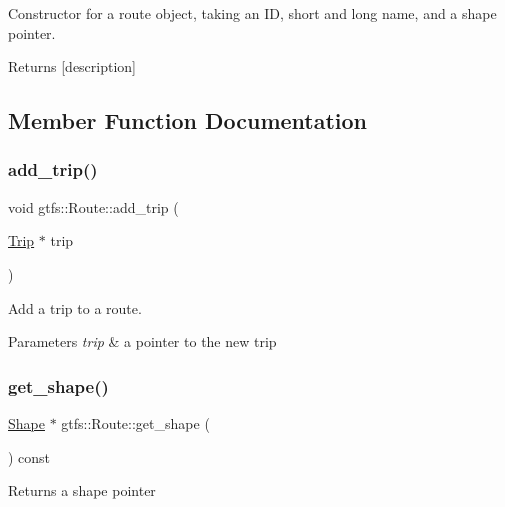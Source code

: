 Constructor for a route object, taking an ID, short and long name, and a shape pointer. \begin{DoxyReturn}{Returns}
\mbox{[}description\mbox{]} 
\end{DoxyReturn}


\subsection{Member Function Documentation}
\mbox{\label{classgtfs_1_1Route_a6029f8e970cc520ca03f58cb8e348b79}} 
\subsubsection{\texorpdfstring{add\+\_\+trip()}{add\_trip()}}
{\footnotesize\ttfamily void gtfs\+::\+Route\+::add\+\_\+trip (\begin{DoxyParamCaption}\item[{\hyperlink{classgtfs_1_1Trip}{Trip} $\ast$}]{trip }\end{DoxyParamCaption})}

Add a trip to a route. 
\begin{DoxyParams}{Parameters}
{\em trip} & a pointer to the new trip \\
\hline
\end{DoxyParams}
\mbox{\label{classgtfs_1_1Route_a02a7b087a0989501dcfbdf4af033f1f5}} 
\subsubsection{\texorpdfstring{get\+\_\+shape()}{get\_shape()}}
{\footnotesize\ttfamily \hyperlink{classgtfs_1_1Shape}{Shape} $\ast$ gtfs\+::\+Route\+::get\+\_\+shape (\begin{DoxyParamCaption}{ }\end{DoxyParamCaption}) const}

\begin{DoxyReturn}{Returns}
a shape pointer 
\end{DoxyReturn}
\mbox{\label{classgtfs_1_1Route_abaca9da2c173387571e1628402eece98}} 
